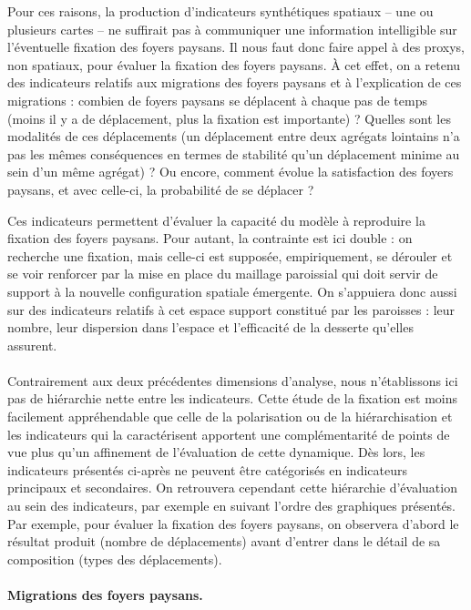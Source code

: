 Pour ces raisons, la production d'indicateurs synthétiques spatiaux -- une ou plusieurs cartes -- ne suffirait pas à communiquer une information intelligible sur l'éventuelle fixation des foyers paysans.
Il nous faut donc faire appel à des \og proxys\fg{}, non spatiaux, pour évaluer la fixation des foyers paysans.
À cet effet, on a retenu des indicateurs relatifs aux migrations des foyers paysans et à l'explication de ces migrations :
combien de foyers paysans se déplacent à chaque pas de temps (moins il y a de déplacement, plus la fixation est importante) ?
Quelles sont les modalités de ces déplacements (un déplacement entre deux agrégats lointains n'a pas les mêmes conséquences en termes de stabilité qu'un déplacement minime au sein d'un même agrégat) ?
Ou encore, comment évolue la satisfaction des foyers paysans, et avec celle-ci, la probabilité de se déplacer ?

Ces indicateurs permettent d'évaluer la capacité du modèle à reproduire la fixation des foyers paysans.
Pour autant, la contrainte est ici double :
on recherche une fixation, mais celle-ci est supposée, empiriquement, se dérouler et se voir renforcer par la mise en place du maillage paroissial qui doit servir de support à la nouvelle configuration spatiale émergente.
On s'appuiera donc aussi sur des indicateurs relatifs à cet espace support constitué par les paroisses :
leur nombre, leur dispersion dans l'espace et l'efficacité de la desserte qu'elles assurent.

\paragraph*{}
Contrairement aux deux précédentes dimensions d'analyse, nous n'établissons ici pas de hiérarchie nette entre les indicateurs.
Cette étude de la fixation est moins facilement appréhendable que celle de la polarisation ou de la hiérarchisation et les indicateurs qui la caractérisent apportent une complémentarité de points de vue plus qu'un affinement de l'évaluation de cette dynamique.
Dès lors, les indicateurs présentés ci-après ne peuvent être catégorisés en indicateurs principaux et secondaires.
On retrouvera cependant cette hiérarchie d'évaluation au sein des indicateurs, par exemple en suivant l'ordre des graphiques présentés.
Par exemple, pour évaluer la fixation des foyers paysans, on observera d'abord le résultat produit (nombre de déplacements) avant d'entrer dans le détail de sa composition (types des déplacements).

\paragraph{Migrations des foyers paysans.}

